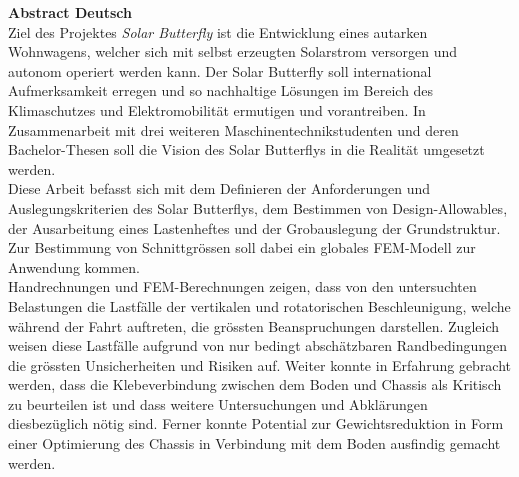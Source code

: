 \textbf{Abstract Deutsch}\\
Ziel des Projektes \emph{Solar Butterfly} ist die Entwicklung eines autarken Wohnwagens, welcher sich mit selbst erzeugten Solarstrom versorgen und autonom operiert werden kann. Der Solar Butterfly soll international Aufmerksamkeit erregen und so nachhaltige Lösungen im Bereich des Klimaschutzes und Elektromobilität ermutigen und vorantreiben. In Zusammenarbeit mit drei weiteren Maschinentechnikstudenten und deren Bachelor-Thesen soll die Vision des Solar Butterflys in die Realität umgesetzt werden.\\
Diese Arbeit befasst sich mit dem Definieren der Anforderungen und Auslegungskriterien des Solar Butterflys, dem Bestimmen von Design-Allowables, der Ausarbeitung eines Lastenheftes und der Grobauslegung der Grundstruktur. Zur Bestimmung von Schnittgrössen soll dabei ein globales FEM-Modell zur Anwendung kommen.\\
Handrechnungen und FEM-Berechnungen zeigen, dass von den untersuchten Belastungen die Lastfälle der vertikalen und rotatorischen Beschleunigung, welche während der Fahrt auftreten, die grössten Beanspruchungen darstellen. Zugleich weisen diese Lastfälle aufgrund von nur bedingt abschätzbaren Randbedingungen die grössten Unsicherheiten und Risiken auf. Weiter konnte in Erfahrung gebracht werden, dass die Klebeverbindung zwischen dem Boden und Chassis als Kritisch zu beurteilen ist und dass weitere Untersuchungen und Abklärungen diesbezüglich nötig sind.
Ferner konnte Potential zur Gewichtsreduktion in Form einer Optimierung des Chassis in Verbindung mit dem Boden ausfindig gemacht werden.


